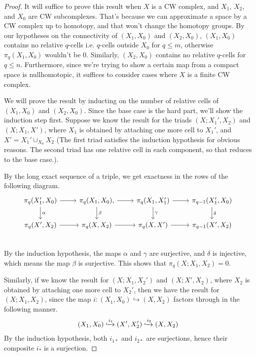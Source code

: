 \documentclass[12pt, notitlepage]{article}
\theoremstyle{definition}
\begin{document}
  \begin{proof}
    It will suffice to prove this result when $X$ is a CW complex, and $X_1$, $X_2$, and $X_0$ are
    CW subcomplexes.  That's because we can approximate a space by a CW complex up to homotopy, and
    that won't change the homotopy groups.  By our hypotheses on the connectivity of $(X_1, X_0)$
    and $(X_2, X_0)$, $(X_1, X_0)$ contains no relative $q$-cells i.e. $q$-cells outside $X_0$ for
    $q \leq m$, otherwise $\pi_q(X_1, X_0)$ wouldn't be $0$. Similarly, $(X_2, X_0)$ contains no
    relative $q$-cells for $q \leq n$. Furthermore, since we're trying to show a certain map from a
    compact space is nullhomotopic, it suffices to consider cases where $X$ is a finite CW complex.

    We will prove the result by inducting on the number of relative cells of $(X_1, X_0)$ and
    $(X_2, X_0)$. Since the base case is the hard part, we'll show the induction step first. Suppose
    we know the result for the triads $(X; X_1', X_2)$ and $(X; X_1, X')$, where $X_1$ is obtained
    by attaching one more cell to $X_1'$, and $X' = X_1' \cup_{X_0} X_2$ (The first triad satisfies
    the induction hypothesis for obvious reasons. The second triad has one relative cell in each
    component, so that reduces to the base case.).
     
    By the long exact sequence of a triple, we get exactness in the rows of the following diagram.
    \[
      \begin{tikzcd}
        \pi_q(X_1', X_0) \ar[d, "\alpha"] \ar[r] & \pi_q(X_1, X_0) \ar[d, "\beta"], \ar[r] &
        \pi_q(X_1, X_1') \ar[d, "\gamma"] \ar[r] & \pi_{q-1}(X_1', X_0) \ar[d, "\delta"] \\
        \pi_q(X', X_2) \ar[r] & \pi_q(X, X_2) \ar[r] & \pi_q(X, X') \ar[r] & \pi_{q-1}(X', X_2) \\
      \end{tikzcd}
    \]
    By the induction hypothesis, the maps $\alpha$ and $\gamma$ are surjective, and $\delta$ is
    injective, which means the map $\beta$ is surjective. This shows that $\pi_q(X; X_1, X_2) = 0$.

    Similarly, if we know the result for $(X; X_1, X_2')$ and $(X; X', X_2)$, where $X_2$ is
    obtained by attaching one more cell to $X_2'$, then we have the result for $(X; X_1, X_2)$,
    since the map $i: (X_1, X_0) \hookrightarrow (X, X_2)$ factors through in the following manner.
    \begin{align*}
      (X_1, X_0) \xhookrightarrow{i_1} (X', X_2') \xhookrightarrow{i_2} (X, X_2)
    \end{align*}
    By the induction hypothesis, both $i_{1 \ast}$ and $i_{2 \ast}$ are surjections, hence their
    composite $i_{\ast}$ is a surjection.


\end{proof}
\end{document}

